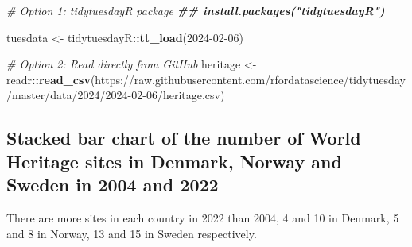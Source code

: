 \documentclass[
]{article}
\newenvironment{Shaded}{\begin{snugshade}}{\end{snugshade}}
\newcommand{\AttributeTok}[1]{\textcolor[rgb]{0.13,0.29,0.53}{#1}}
\newcommand{\CommentTok}[1]{\textcolor[rgb]{0.56,0.35,0.01}{\textit{#1}}}
\newcommand{\DecValTok}[1]{\textcolor[rgb]{0.00,0.00,0.81}{#1}}
\newcommand{\DocumentationTok}[1]{\textcolor[rgb]{0.56,0.35,0.01}{\textbf{\textit{#1}}}}
\newcommand{\FunctionTok}[1]{\textcolor[rgb]{0.13,0.29,0.53}{\textbf{#1}}}
\newcommand{\NormalTok}[1]{#1}
\newcommand{\OtherTok}[1]{\textcolor[rgb]{0.56,0.35,0.01}{#1}}
\newcommand{\SpecialCharTok}[1]{\textcolor[rgb]{0.81,0.36,0.00}{\textbf{#1}}}
\newcommand{\StringTok}[1]{\textcolor[rgb]{0.31,0.60,0.02}{#1}}
\begin{document}
\begin{Shaded}
\begin{Highlighting}[numbers=left,,]
\CommentTok{\# Option 1: tidytuesdayR package }
\DocumentationTok{\#\# install.packages("tidytuesdayR")}

\NormalTok{tuesdata }\OtherTok{\textless{}{-}}\NormalTok{ tidytuesdayR}\SpecialCharTok{::}\FunctionTok{tt\_load}\NormalTok{(}\StringTok{\textquotesingle{}2024{-}02{-}06\textquotesingle{}}\NormalTok{)}
\end{Highlighting}
\end{Shaded}

\begin{Shaded}
\end{Shaded}

\begin{Shaded}
\begin{Highlighting}[numbers=left,,]
\CommentTok{\# Option 2: Read directly from GitHub}
\NormalTok{heritage }\OtherTok{\textless{}{-}}\NormalTok{ readr}\SpecialCharTok{::}\FunctionTok{read\_csv}\NormalTok{(}\StringTok{\textquotesingle{}https://raw.githubusercontent.com/rfordatascience/tidytuesday/master/data/2024/2024{-}02{-}06/heritage.csv\textquotesingle{}}\NormalTok{)}
\end{Highlighting}
\end{Shaded}

\newpage

\subsection{Stacked bar chart of the number of World Heritage sites in
Denmark, Norway and Sweden in 2004 and
2022}\label{stacked-bar-chart-of-the-number-of-world-heritage-sites-in-denmark-norway-and-sweden-in-2004-and-2022}

There are more sites in each country in 2022 than 2004, 4 and 10 in
Denmark, 5 and 8 in Norway, 13 and 15 in Sweden respectively.
\end{document}
